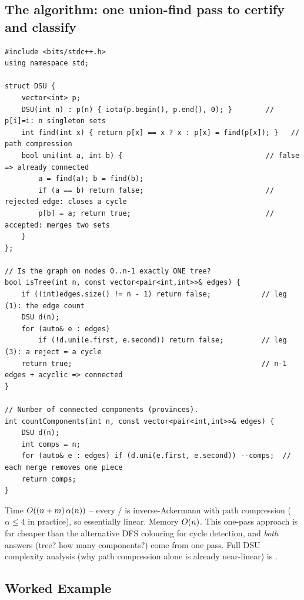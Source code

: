 \subsection{The algorithm: one union-find pass to certify and classify}

\begin{lstlisting}[caption={Union-find pre-look: decide tree / forest / cyclic, and count components}, label={lst:c25-uf}]
#include <bits/stdc++.h>
using namespace std;

struct DSU {
    vector<int> p;
    DSU(int n) : p(n) { iota(p.begin(), p.end(), 0); }        // p[i]=i: n singleton sets
    int find(int x) { return p[x] == x ? x : p[x] = find(p[x]); }   // path compression
    bool uni(int a, int b) {                                  // false => already connected
        a = find(a); b = find(b);
        if (a == b) return false;                             // rejected edge: closes a cycle
        p[b] = a; return true;                                // accepted: merges two sets
    }
};

// Is the graph on nodes 0..n-1 exactly ONE tree?
bool isTree(int n, const vector<pair<int,int>>& edges) {
    if ((int)edges.size() != n - 1) return false;            // leg (1): the edge count
    DSU d(n);
    for (auto& e : edges)
        if (!d.uni(e.first, e.second)) return false;         // leg (3): a reject = a cycle
    return true;                                             // n-1 edges + acyclic => connected
}

// Number of connected components (provinces).
int countComponents(int n, const vector<pair<int,int>>& edges) {
    DSU d(n);
    int comps = n;
    for (auto& e : edges) if (d.uni(e.first, e.second)) --comps;  // each merge removes one piece
    return comps;
}
\end{lstlisting}
\begin{complexitybox}
Time $O((n+m)\,\alpha(n))$ -- every / is inverse-Ackermann with path
compression ($\alpha\le4$ in practice), so essentially linear. Memory $O(n)$. This one-pass
approach is far cheaper than the alternative DFS colouring for cycle detection, and \emph{both}
answers (tree? how many components?) come from one pass. Full DSU complexity analysis (why path
compression alone is already near-linear) is .
\end{complexitybox}

\subsection{Worked Example}

